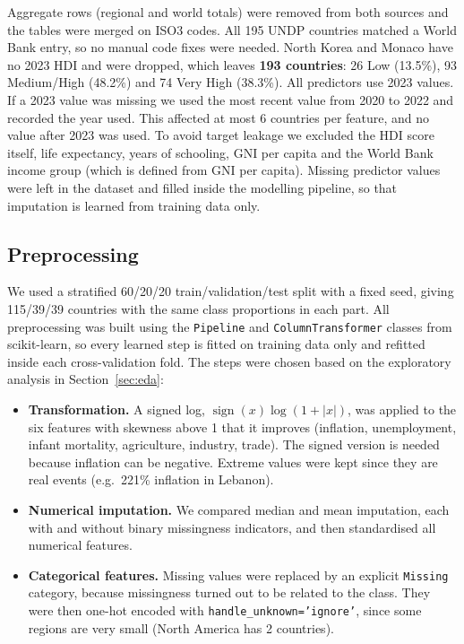 \documentclass[10pt]{article}
\begin{document}
Aggregate rows (regional and world totals) were removed from both sources and the tables were merged on ISO3
codes. All 195 UNDP countries matched a World Bank entry, so no manual code fixes were needed. North Korea and
Monaco have no 2023 HDI and were dropped, which leaves \textbf{193 countries}: 26 Low (13.5\%), 93 Medium/High
(48.2\%) and 74 Very High (38.3\%). All predictors use 2023 values. If a 2023 value was missing we used the most
recent value from 2020 to 2022 and recorded the year used. This affected at most 6 countries per feature, and no
value after 2023 was used. To avoid target leakage we excluded the HDI score itself, life expectancy, years of
schooling, GNI per capita and the World Bank income group (which is defined from GNI per capita). Missing
predictor values were left in the dataset and filled inside the modelling pipeline, so that imputation is
learned from training data only.

\subsection{Preprocessing}

We used a stratified 60/20/20 train/validation/test split with a fixed seed, giving 115/39/39 countries with the
same class proportions in each part. All preprocessing was built using the \texttt{Pipeline} and
\texttt{ColumnTransformer} classes from scikit-learn, so every learned step is fitted on training data only
and refitted inside each cross-validation fold. The steps were chosen based on the exploratory analysis in
Section~\ref{sec:eda}:
\begin{itemize}
  \item \textbf{Transformation.} A signed log, $\operatorname{sign}(x)\log(1+|x|)$, was applied to the six features
  with skewness above 1 that it improves (inflation, unemployment, infant mortality, agriculture, industry, trade).
  The signed version is needed because inflation can be negative. Extreme values were kept since they are
  real events (e.g.\ 221\% inflation in Lebanon).
  \item \textbf{Numerical imputation.} We compared median and mean imputation, each with and without binary
  missingness indicators, and then standardised all numerical features.
  \item \textbf{Categorical features.} Missing values were replaced by an explicit \texttt{Missing} category,
  because missingness turned out to be related to the class. They were then one-hot encoded with
  \texttt{handle\_unknown='ignore'}, since some regions are very small (North America has 2 countries).
\end{itemize}
\end{document}
